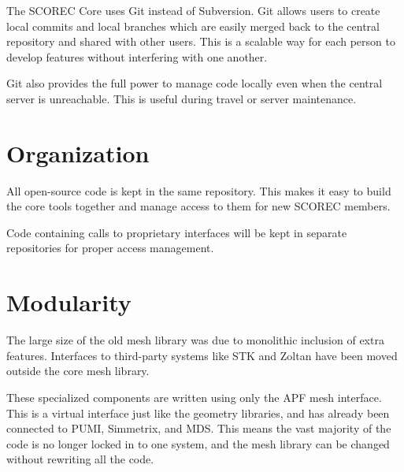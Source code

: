 \documentclass{article}
\begin{document}
The SCOREC Core uses Git instead of Subversion.
Git allows users to create local commits and local branches
which are easily merged back to the central repository
and shared with other users.
This is a scalable way for each person to develop features
without interfering with one another.

Git also provides the full power to manage code locally even
when the central server is unreachable.
This is useful during travel or server maintenance.

\section{Organization}

All open-source code is kept in the same repository.
This makes it easy to build the core tools together
and manage access to them for new SCOREC members.

Code containing calls to proprietary interfaces will
be kept in separate repositories for proper access management.

\section{Modularity}

The large size of the old mesh library was due to monolithic
inclusion of extra features.
Interfaces to third-party systems like STK and Zoltan have
been moved outside the core mesh library.

These specialized components are written using only the APF mesh
interface.
This is a virtual interface just like the geometry libraries,
and has already been connected to PUMI, Simmetrix, and MDS.
This means the vast majority of the code is no longer locked in
to one system, and the mesh library can be changed without
rewriting all the code.
\end{document}

